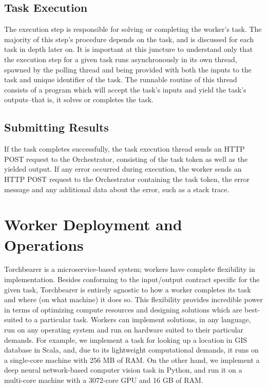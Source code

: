 \subsection{Task Execution}

The execution step is responsible for solving or completing the worker’s task. The majority of this step’s procedure depends on the task, and is discussed for each task in depth later on. It is important at this juncture to understand only that the execution step for a given task runs asynchronously in its own thread, spawned by the polling thread and being provided with both the inputs to the task and unique identifier of the task. The runnable routine of this thread consists of a program which will accept the task’s inputs and yield the task’s outputs--that is, it solves or completes the task. 

\subsection{Submitting Results}

If the task completes successfully, the task execution thread sends an HTTP POST request to the Orchestrator, consisting of the task token as well as the yielded output. If any error occurred during execution, the worker sends an HTTP POST request to the Orchestrator containing the task token, the error message and any additional data about the error, such as a stack trace.

\section{Worker Deployment and Operations}
Torchbearer is a microservice-based system; workers have complete flexibility in implementation. Besides conforming to the input/output contract specific for the given task, Torchbearer is entirely agnostic to how a worker completes its task and where (on what machine) it does so. This flexibility provides incredible power in terms of optimizing compute resources and designing solutions which are best-suited to a particular task. Workers can implement solutions, in any language, run on any operating system and run on hardware suited to their particular demands. For example, we implement a task for looking up a location in GIS database in Scala, and, due to its lightweight computational demands, it runs on a single-core machine with 256 MB of RAM. On the other hand, we implement a deep neural network-based computer vision task in Python, and run it on a multi-core machine with a 3072-core GPU and 16 GB of RAM.

